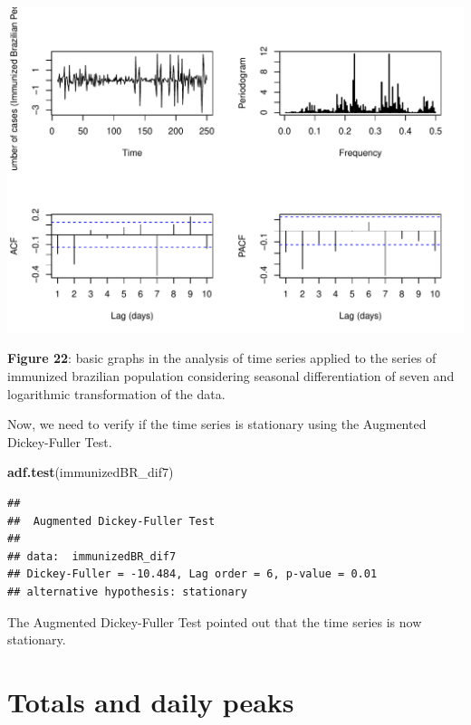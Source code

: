 \documentclass[
]{article}
\newenvironment{Shaded}{\begin{snugshade}}{\end{snugshade}}
\newcommand{\FunctionTok}[1]{\textcolor[rgb]{0.13,0.29,0.53}{\textbf{#1}}}
\newcommand{\NormalTok}[1]{#1}
\renewenvironment{Shaded}{\begin{mdframed}[ backgroundcolor=shadecolor, linecolor = shadecolor, leftmargin=\dimexpr\leftmargin-2pt\relax, innerleftmargin=1.6pt, innertopmargin=5pt, skipabove=10pt,skipbelow=3pt ]}{\end{mdframed}}
\begin{document}
\begin{center}\includegraphics[width=\linewidth]{IF_results_ENG_files/figure-latex/unnamed-chunk-27-1} \end{center}

\textbf{Figure 22}: basic graphs in the analysis of time series applied
to the series of immunized brazilian population considering seasonal
differentiation of seven and logarithmic transformation of the data.

Now, we need to verify if the time series is stationary using the
Augmented Dickey-Fuller Test.

\begin{Shaded}
\begin{Highlighting}[]
\FunctionTok{adf.test}\NormalTok{(immunizedBR\_dif7)}
\end{Highlighting}
\end{Shaded}

\begin{verbatim}
## 
##  Augmented Dickey-Fuller Test
## 
## data:  immunizedBR_dif7
## Dickey-Fuller = -10.484, Lag order = 6, p-value = 0.01
## alternative hypothesis: stationary
\end{verbatim}

The Augmented Dickey-Fuller Test pointed out that the time series is now
stationary.

\section{Totals and daily peaks}
\end{document}
